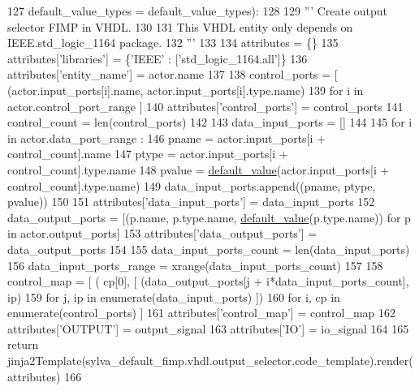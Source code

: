 \begin{DoxyCode}
127     default\_value\_types = default\_value\_types):
128 
129     \textcolor{stringliteral}{''' Create output selector FIMP in VHDL.}
130 \textcolor{stringliteral}{}
131 \textcolor{stringliteral}{    This VHDL entity only depends on IEEE.std\_logic\_1164 package.}
132 \textcolor{stringliteral}{    '''}
133 
134     attributes = \{\}
135     attributes[\textcolor{stringliteral}{'libraries'}] = \{\textcolor{stringliteral}{'IEEE'} : [\textcolor{stringliteral}{'std\_logic\_1164.all'}]\}
136     attributes[\textcolor{stringliteral}{'entity\_name'}] = actor.name
137 
138     control\_ports = [ (actor.input\_ports[i].name, actor.input\_ports[i].type.name)
139                       \textcolor{keywordflow}{for} i \textcolor{keywordflow}{in} actor.control\_port\_range ]
140     attributes[\textcolor{stringliteral}{'control\_ports'}] = control\_ports
141     control\_count = len(control\_ports)
142 
143     data\_input\_ports = []
144 
145     \textcolor{keywordflow}{for} i \textcolor{keywordflow}{in} actor.data\_port\_range :
146       pname = actor.input\_ports[i + control\_count].name
147       ptype = actor.input\_ports[i + control\_count].type.name
148       pvalue = \hyperlink{namespacesylva_1_1code__generation_1_1sylva__fimp__lib_a7ade6c6728b5e51bbbbfef039fc718cc}{default\_value}(actor.input\_ports[i + control\_count].type.name)
149       data\_input\_ports.append((pname, ptype, pvalue))
150 
151     attributes[\textcolor{stringliteral}{'data\_input\_ports'}] = data\_input\_ports
152     data\_output\_ports = [(p.name, p.type.name, \hyperlink{namespacesylva_1_1code__generation_1_1sylva__fimp__lib_a7ade6c6728b5e51bbbbfef039fc718cc}{default\_value}(p.type.name)) \textcolor{keywordflow}{for} p \textcolor{keywordflow}{in} 
      actor.output\_ports]
153     attributes[\textcolor{stringliteral}{'data\_output\_ports'}] = data\_output\_ports
154 
155     data\_input\_ports\_count = len(data\_input\_ports)
156     data\_input\_ports\_range = xrange(data\_input\_ports\_count)
157 
158     control\_map = [ ( cp[0], [ (data\_output\_ports[j + i*data\_input\_ports\_count], ip)
159                                \textcolor{keywordflow}{for} j, ip \textcolor{keywordflow}{in} enumerate(data\_input\_ports) ])
160                       \textcolor{keywordflow}{for} i, cp \textcolor{keywordflow}{in} enumerate(control\_ports) ]
161     attributes[\textcolor{stringliteral}{'control\_map'}] = control\_map
162     attributes[\textcolor{stringliteral}{'OUTPUT'}] = output\_signal
163     attributes[\textcolor{stringliteral}{'IO'}] = io\_signal
164 
165     \textcolor{keywordflow}{return} jinja2Template(sylva\_default\_fimp.vhdl.output\_selector.code\_template).render(attributes)
166 
\end{DoxyCode}
\mbox{\label{namespacesylva_1_1code__generation_1_1sylva__fimp__lib_a7ade6c6728b5e51bbbbfef039fc718cc}} 
